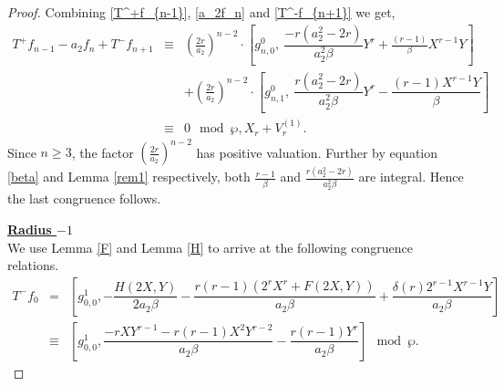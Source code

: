 \documentclass[11pt, reqno]{amsart}
\numberwithin{equation}{section}
\theoremstyle{definition}
\theoremstyle{remark}
\theoremstyle{definition}
\theoremstyle{remark}
\theoremstyle{remark}
\begin{document}
\begin{proof}
 
 Combining \eqref{T^+f_{n-1}}, \eqref{a_2f_n} and \eqref{T^-f_{n+1}} we get,
 \begin{eqnarray*}
 T^+f_{n-1}-a_{2}f_{n}+T^{-}f_{n+1}& \equiv & \left(\frac{2r}{a_{2}}\right)^{n-2}\cdot\left[g_{n,0}^{0},\: \dfrac{-r(a_{2}^2-2r)}{a_{2}^2\beta}Y^r + \frac{(r-1)}{\beta}X^{r-1}Y\right]\\
 & & +\left(\frac{2r}{a_{2}}\right)^{n-2}\cdot\left[g_{n,1}^{0}, \:\dfrac{r(a_{2}^2-2r)}{a_{2}^2\beta}Y^r - \dfrac{(r-1)X^{r-1}Y}{\beta}\right]\\
 & \equiv& 0 \mod \wp, X_{r}+V_{r}^{(1)}.
 \end{eqnarray*}
Since $n \geq 3$,  the factor $\left(\frac{2r}{a_{2}}\right)^{n-2}$ has positive valuation. Further by equation \eqref{beta} and Lemma \ref{rem1} respectively, both $\frac{r-1}{\beta}$ and $\frac{r(a_{2}^2-2r)}{a_{2}^2\beta}$   are integral. Hence the  last congruence follows.%

\noindent\textbf{\underline{Radius $-1$}}\\
We use Lemma \ref{F} and Lemma \ref{H} to arrive at the following congruence relations.
\begin{eqnarray} \label{T-f0}
T^{-}f_{0}&=&\left[g_{0,0}^{1}, -\dfrac{H(2X,Y)}{2a_2\beta}-\dfrac{r(r-1)(2^rX^r+F(2X,Y))}{a_2\beta} + \dfrac{\delta(r)2^{r-1}X^{r-1}Y}{a_{2}\beta}\right]\nonumber\\
&\equiv& 
 \left[g_{0,0}^{1}, \dfrac{-rXY^{r-1}-r(r-1)X^2Y^{r-2}}{a_{2}\beta}-\dfrac{r(r-1)Y^r}{a_{2}\beta}\right]\mod\wp. %
\end{eqnarray}


\end{proof}
\end{document}
